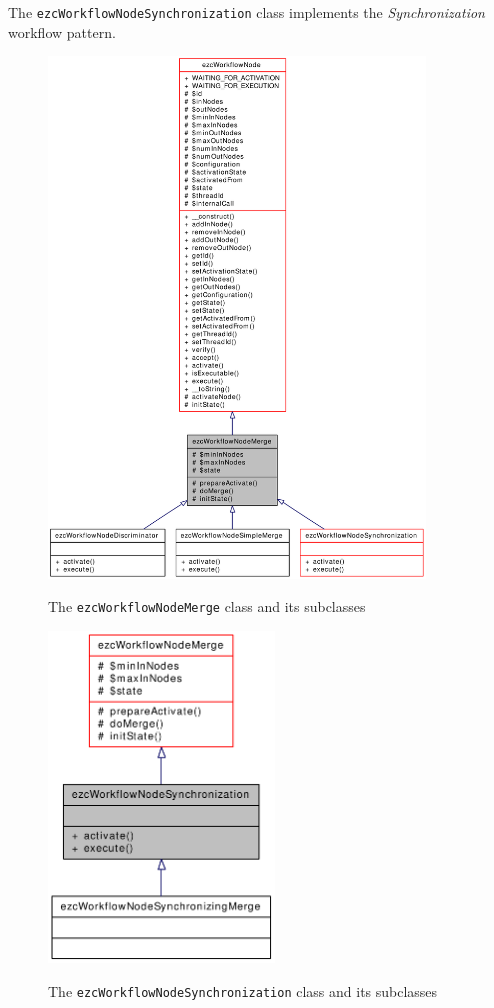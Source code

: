 The \texttt{ezcWorkflowNodeSynchronization} class implements the
\emph{Synchronization} workflow pattern.

\begin{figure}[hbt]
\begin{center}
\includegraphics[width=10cm]{figures/WorkflowNodeMerge}\\[5mm]
\end{center}
\caption{The \texttt{ezcWorkflowNodeMerge} class and its subclasses}
\label{classezcWorkflowNodeMerge}
\end{figure}

\begin{figure}[hbt]
\begin{center}
\includegraphics[width=6cm]{figures/WorkflowNodeSynchronization}\\[5mm]
\end{center}
\caption{The \texttt{ezcWorkflowNodeSynchronization} class and its subclasses}
\label{classezcWorkflowNodeSynchronization}
\end{figure}

